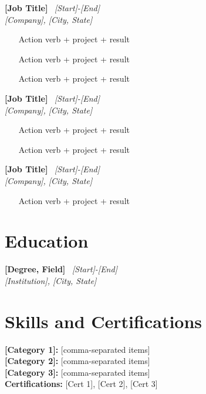 \documentclass[10.5pt,letterpaper]{article}
\newcommand{\cvheader}[3]{%
  \noindent\textbf{#1} \textbar\ \textit{#3}\\
  \textit{#2}
}
\begin{document}
\vspace{4pt}
\cvheader{[Job Title]}{[Company], [City, State]}{[Start]-[End]}
\begin{itemize}
  \item [Action verb + project + result]
  \item [Action verb + project + result]
  \item [Action verb + project + result]
\end{itemize}

\vspace{4pt}
\cvheader{[Job Title]}{[Company], [City, State]}{[Start]-[End]}
\begin{itemize}
  \item [Action verb + project + result]
  \item [Action verb + project + result]
\end{itemize}

\vspace{4pt}
\cvheader{[Job Title]}{[Company], [City, State]}{[Start]-[End]}
\begin{itemize}
  \item [Action verb + project + result]
\end{itemize}

\section{Education}
\cvheader{[Degree, Field]}{[Institution], [City, State]}{[Start]-[End]}

\section{Skills and Certifications}
\textbf{[Category 1]:} [comma-separated items] \\
\textbf{[Category 2]:} [comma-separated items] \\
\textbf{[Category 3]:} [comma-separated items] \\
\textbf{Certifications:} [Cert 1], [Cert 2], [Cert 3]
\end{document}
